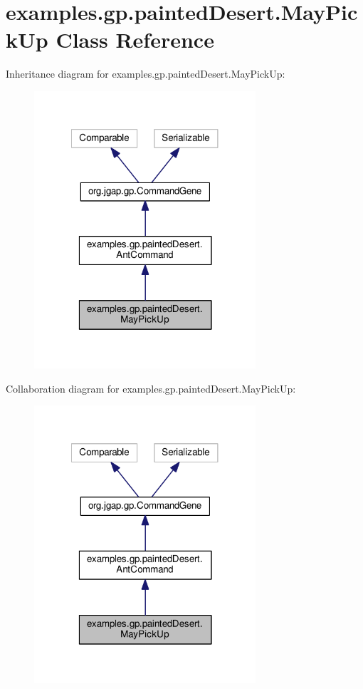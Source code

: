 \hypertarget{classexamples_1_1gp_1_1painted_desert_1_1_may_pick_up}{\section{examples.\-gp.\-painted\-Desert.\-May\-Pick\-Up Class Reference}
\label{classexamples_1_1gp_1_1painted_desert_1_1_may_pick_up}
}


Inheritance diagram for examples.\-gp.\-painted\-Desert.\-May\-Pick\-Up\-:
\nopagebreak
\begin{figure}[H]
\begin{center}
\leavevmode
\includegraphics[width=233pt]{classexamples_1_1gp_1_1painted_desert_1_1_may_pick_up__inherit__graph}
\end{center}
\end{figure}


Collaboration diagram for examples.\-gp.\-painted\-Desert.\-May\-Pick\-Up\-:
\nopagebreak
\begin{figure}[H]
\begin{center}
\leavevmode
\includegraphics[width=233pt]{classexamples_1_1gp_1_1painted_desert_1_1_may_pick_up__coll__graph}
\end{center}
\end{figure}
